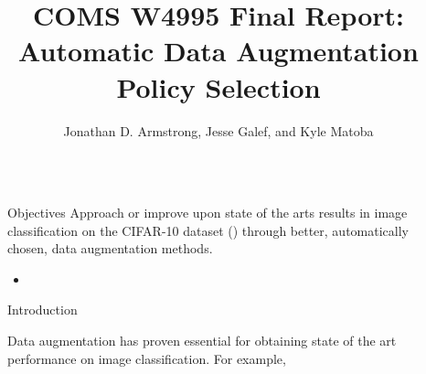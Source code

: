 \documentclass[final]{beamer}
\title{COMS W4995 Final Report: Automatic Data Augmentation Policy Selection} %
\author{Jonathan D. Armstrong, Jesse Galef, and Kyle Matoba} %
\institute{Computer Science Department, Columbia University} %
\newlength{\sepwid}
\newlength{\onecolwid}
\begin{document}

\setlength{\belowcaptionskip}{2ex} %
\setlength\belowdisplayshortskip{2ex} %

\begin{frame}[t] %
\begin{columns}[t] %

\begin{column}{\sepwid}\end{column} %
\begin{column}{\onecolwid} %

\begin{alertblock}{Objectives}
Approach or improve upon state of the arts results in image classification on the CIFAR-10 dataset (\cite{Krizhevsky2009}) through better, automatically chosen, data augmentation methods. 

\begin{itemize}
\item \cite{Cubuk2018}
\end{itemize}

\end{alertblock}


\begin{block}{Introduction}

Data augmentation has proven essential for obtaining state of the art performance on image classification. For example, 


\end{block}
\end{column}
\end{columns}
\end{frame}
\end{document}
